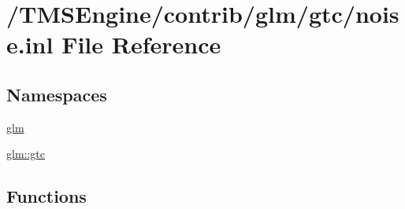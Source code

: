 \hypertarget{noise_8inl}{}\section{/\+T\+M\+S\+Engine/contrib/glm/gtc/noise.inl File Reference}
\label{noise_8inl}
\subsection*{Namespaces}
\begin{DoxyCompactItemize}
\item 
 \hyperlink{namespaceglm}{glm}
\item 
 \hyperlink{namespaceglm_1_1gtc}{glm\+::gtc}
\end{DoxyCompactItemize}
\subsection*{Functions}
